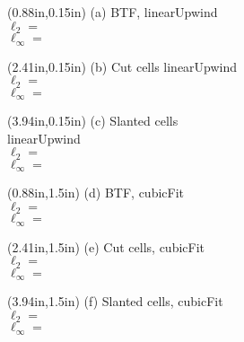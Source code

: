 \documentclass{article}
\begin{document}
\begin{textblock*}{12em}(0.88in,0.15in)
\footnotesize
(a) BTF, linearUpwind \\
\hspace*{0.2em}$\ell_2 = $ \\
\hspace*{0.2em}$\ell_\infty = $
\end{textblock*}
\begin{textblock*}{12em}(2.41in,0.15in)
\footnotesize
(b) Cut cells linearUpwind \\
\hspace*{0.2em}$\ell_2 = $ \\
\hspace*{0.2em}$\ell_\infty = $
\end{textblock*}
\begin{textblock*}{12em}(3.94in,0.15in)
\footnotesize
(c) Slanted cells \\
linearUpwind \\
\hspace*{0.2em}$\ell_2 = $ \\
\hspace*{0.2em}$\ell_\infty = $
\end{textblock*}
\begin{textblock*}{12em}(0.88in,1.5in)
\footnotesize
(d) BTF, cubicFit \\
\hspace*{0.2em}$\ell_2 = $ \\
\hspace*{0.2em}$\ell_\infty = $
\end{textblock*}
\begin{textblock*}{12em}(2.41in,1.5in)
\footnotesize
(e) Cut cells, cubicFit \\
\hspace*{0.2em}$\ell_2 = $ \\
\hspace*{0.2em}$\ell_\infty = $
\end{textblock*}
\begin{textblock*}{12em}(3.94in,1.5in)
\footnotesize
(f) Slanted cells, cubicFit \\
\hspace*{0.2em}$\ell_2 = $ \\
\hspace*{0.2em}$\ell_\infty = $
\end{textblock*}
\end{document}
